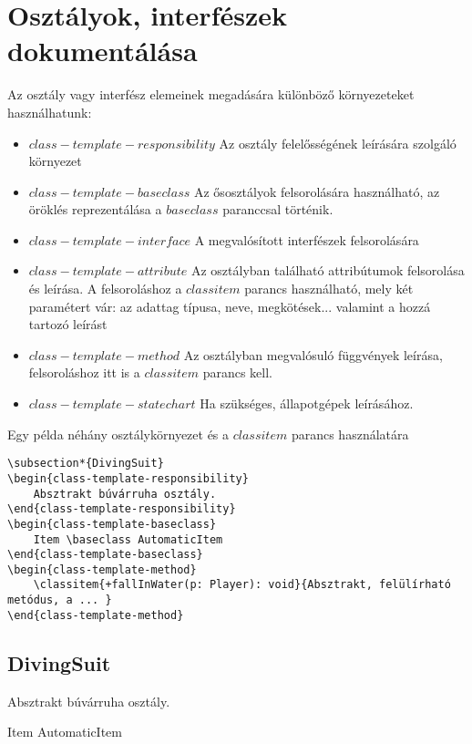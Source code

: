 \documentclass[]{article}
\begin{document}
\section{Osztályok, interfészek dokumentálása}
Az osztály vagy interfész elemeinek megadására különböző környezeteket használhatunk: 
\begin{itemize}
    \item $class-template-responsibility$ Az osztály felelősségének leírására szolgáló környezet
    \item $class-template-baseclass$ Az ősosztályok felsorolására használható, az öröklés reprezentálása a $baseclass$ paranccsal történik.
    \item $class-template-interface$ A megvalósított interfészek felsorolására
    \item $class-template-attribute$ Az osztályban található attribútumok felsorolása és leírása. A felsoroláshoz a $classitem$ parancs használható, mely két paramétert vár: az adattag típusa, neve, megkötések... valamint a hozzá tartozó leírást
    \item $class-template-method$ Az osztályban megvalósuló függvények leírása, felsoroláshoz itt is a $classitem$ parancs kell.
    \item $class-template-statechart$ Ha szükséges, állapotgépek leírásához.
\end{itemize}
Egy példa néhány osztálykörnyezet és a $classitem$ parancs használatára
\begin{lstlisting}
\subsection*{DivingSuit}
\begin{class-template-responsibility}
    Absztrakt búvárruha osztály.
\end{class-template-responsibility}
\begin{class-template-baseclass}		
    Item \baseclass AutomaticItem
\end{class-template-baseclass}
\begin{class-template-method}
    \classitem{+fallInWater(p: Player): void}{Absztrakt, felülírható metódus, a ... }
\end{class-template-method}
\end{lstlisting}
\subsection*{DivingSuit}
\begin{class-template-responsibility}
    Absztrakt búvárruha osztály.
\end{class-template-responsibility}
\begin{class-template-baseclass}		
    Item \baseclass AutomaticItem
\end{class-template-baseclass}
\begin{class-template-method}
\end{class-template-method}
\end{document}

